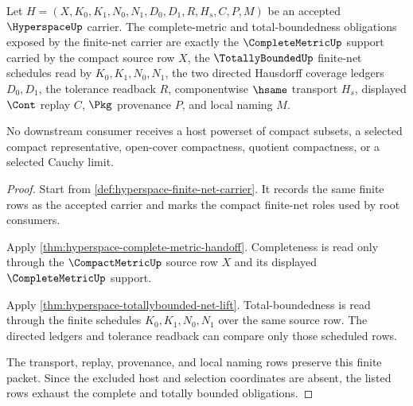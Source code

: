 \begin{theorem}
\label{thm:hyperspace-complete-totallybounded-obligations}
Let $H=(X,K_0,K_1,N_0,N_1,D_0,D_1,R,H_s,C,P,M)$ be an accepted $\HyperspaceUp$ carrier. The complete-metric and total-boundedness obligations exposed by the finite-net carrier are exactly the $\CompleteMetricUp$ support carried by the compact source row $X$, the $\TotallyBoundedUp$ finite-net schedules read by $K_0,K_1,N_0,N_1$, the two directed Hausdorff coverage ledgers $D_0,D_1$, the tolerance readback $R$, componentwise $\hsame$ transport $H_s$, displayed $\Cont$ replay $C$, $\Pkg$ provenance $P$, and local naming $M$.

No downstream consumer receives a host powerset of compact subsets, a selected compact representative, open-cover compactness, quotient compactness, or a selected Cauchy limit.
\end{theorem}
\begin{proof}
Start from \autoref{def:hyperspace-finite-net-carrier}. It records the same finite rows as the accepted carrier and marks the compact finite-net roles used by root consumers.

Apply \autoref{thm:hyperspace-complete-metric-handoff}. Completeness is read only through the $\CompactMetricUp$ source row $X$ and its displayed $\CompleteMetricUp$ support.

Apply \autoref{thm:hyperspace-totallybounded-net-lift}. Total-boundedness is read through the finite schedules $K_0,K_1,N_0,N_1$ over the same source row. The directed ledgers and tolerance readback can compare only those scheduled rows.

The transport, replay, provenance, and local naming rows preserve this finite packet. Since the excluded host and selection coordinates are absent, the listed rows exhaust the complete and totally bounded obligations.
\end{proof}

